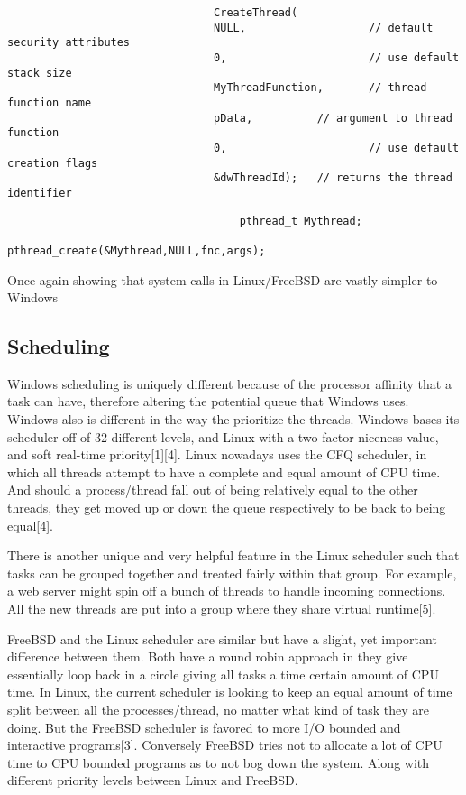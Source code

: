 \documentclass{article}
\begin{document}
                    	  \begin{lstlisting}
                                CreateThread(
                                NULL,                   // default security attributes
                                0,                      // use default stack size
                                MyThreadFunction,       // thread function name
                                pData,          // argument to thread function
                                0,                      // use default creation flags
                                &dwThreadId);   // returns the thread identifier
                        \end{lstlisting}



                                \begin{lstlisting}
                                	pthread_t Mythread;
                                    pthread_create(&Mythread,NULL,fnc,args);
                                \end{lstlisting}
                                Once again showing that system calls in Linux/FreeBSD are vastly simpler to Windows

\subsection{Scheduling}
	Windows scheduling is uniquely different because of the processor affinity that a task can have, therefore altering the potential queue that Windows uses. Windows also is different in the way the prioritize the threads. Windows bases its scheduler off of 32 different levels, and Linux with a two factor niceness value, and soft real-time priority[1][4]. Linux nowadays uses the CFQ scheduler, in which all threads attempt to have a complete and equal amount of CPU time. And should a process/thread fall out of being relatively equal to the other threads, they get moved up or down the queue respectively to be back to being equal[4].

    There is another unique and very helpful feature in the Linux scheduler such that tasks can be grouped together and treated fairly within that group. For example, a web server might spin off a bunch of threads to handle incoming connections. All the new threads are put into a group where they share virtual runtime[5].

	FreeBSD and the Linux scheduler are similar but have a slight, yet important difference between them. Both have a round robin approach in they give essentially loop back in a circle giving all tasks a time certain amount of CPU time. In Linux, the current scheduler is looking to keep an equal amount of time split between all the processes/thread, no matter what kind of task they are doing. But the FreeBSD scheduler is favored to more I/O bounded and interactive programs[3]. Conversely FreeBSD tries not to allocate a lot of CPU time to CPU bounded programs as to not bog down the system. Along with different priority levels between Linux and FreeBSD.
\end{document}
